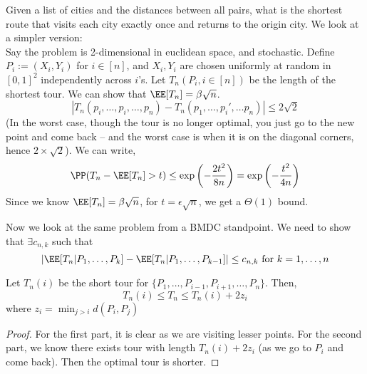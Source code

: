 \begin{eg}
Given a list of cities and the distances between all pairs, what is the shortest route that visits each city exactly once and returns to the origin city. We look at a simpler version:\\
Say the problem is 2-dimensional in euclidean space, and stochastic. Define $P_i := (X_i, Y_i)$ for $i \in [n]$, and $X_i, Y_i$ are chosen uniformly at random in $[0,1]^2$ independently across $i$'s. Let $T_n(P_i, i \in [n])$ be the length of the shortest tour. We can show that $\EE[T_n] = \beta\sqrt{n}$. 
\[
|T_n(p_i, \dots, p_i, \dots, p_n) - T_n(p_1, \dots, p_i', \dots p_n)| \leq 2\sqrt{2}
\]
(In the worst case, though the tour is no longer optimal, you just go to the new point and come back -- and the worst case is when it is on the diagonal corners, hence $2 \times \sqrt{2}$). We can write,
\[
\PP(T_n - \EE[T_n] > t)\leq \exp\left(-\frac{2t^2}{8n}\right) = \exp\left(-\frac{t^2}{4n}\right)
\]
Since we know $\EE[T_n] = \beta\sqrt{n}$, for $t = \epsilon{\sqrt{n}}$, we get a $\Theta(1)$ bound.
\end{eg}
\begin{eg}
Now we look at the same problem from a BMDC standpoint. We need to show that $\exists c_{n,k}$ such that
\[
|\EE[T_n | P_1, \dots, P_k] - \EE[T_n | P_1, \dots, P_{k-1}]| \leq c_{n,k} \text{ for }k=1,\dots,n
\]
\begin{lemma}\label{lemma:shortest-tour}
Let $T_n(i)$ be the short tour for $\{P_1, \dots, P_{i-1}, P_{i+1}, \dots, P_n\}$. Then,
\[
T_n(i) \leq T_n \leq T_n(i) + 2z_i
\]
where $z_i = \min_{j > i} d(P_i, P_j)$
\end{lemma}
\begin{proof}
For the first part, it is clear as we are visiting lesser points. For the second part, we know there exists tour with length $T_n(i) + 2z_i$ (as we go to $P_i$ and come back). Then the optimal tour is shorter.
\end{proof}
\end{eg}